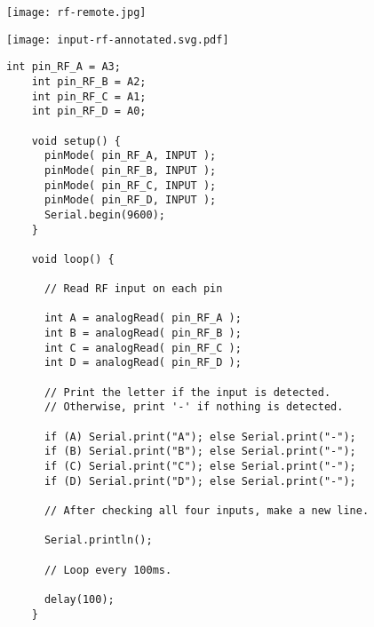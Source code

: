 \vspace{0.1in}
\begin{minipage}[t]{0.49\tw}

  \vspace{0.1in}
  \texttt{[image: rf-remote.jpg]}

  \vspace{0.1in}
  \texttt{[image: input-rf-annotated.svg.pdf]}

\end{minipage}
\hfill
\begin{minipage}[t]{0.49\tw}
  \vspace{0.1in}
  \begin{Verbatim}[gobble=3,fontsize=\small]
    int pin_RF_A = A3;
    int pin_RF_B = A2;
    int pin_RF_C = A1;
    int pin_RF_D = A0;

    void setup() {
      pinMode( pin_RF_A, INPUT );
      pinMode( pin_RF_B, INPUT );
      pinMode( pin_RF_C, INPUT );
      pinMode( pin_RF_D, INPUT );
      Serial.begin(9600);
    }

    void loop() {

      // Read RF input on each pin

      int A = analogRead( pin_RF_A );
      int B = analogRead( pin_RF_B );
      int C = analogRead( pin_RF_C );
      int D = analogRead( pin_RF_D );

      // Print the letter if the input is detected.
      // Otherwise, print '-' if nothing is detected.

      if (A) Serial.print("A"); else Serial.print("-");
      if (B) Serial.print("B"); else Serial.print("-");
      if (C) Serial.print("C"); else Serial.print("-");
      if (D) Serial.print("D"); else Serial.print("-");

      // After checking all four inputs, make a new line.

      Serial.println();

      // Loop every 100ms.

      delay(100);
    }
  \end{Verbatim}
\end{minipage}
\vspace{0.1in}

